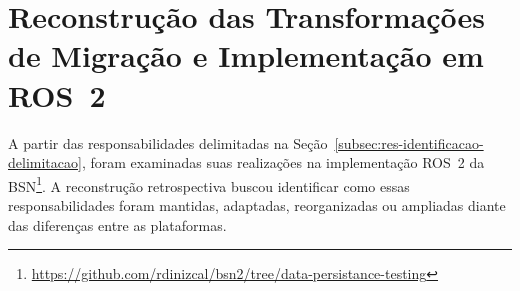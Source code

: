 \section{Reconstrução das Transformações de Migração
e Implementação em ROS~2}
\label{sec:resultados-planejamento-transformacoes}



A partir das responsabilidades delimitadas na Seção~\ref{subsec:res-identificacao-delimitacao}, foram examinadas suas realizações na implementação ROS~2 da BSN\footnote{\url{https://github.com/rdinizcal/bsn2/tree/data-persistance-testing}}. A reconstrução retrospectiva buscou identificar como essas responsabilidades foram mantidas, adaptadas, reorganizadas ou ampliadas diante das diferenças entre as plataformas.

